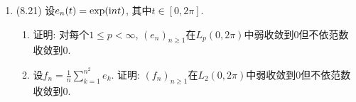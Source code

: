 \begin{enumerate}[label=\textbf{\arabic*.}, ref=\arabic*]
\begin{enumerate}[(1)]
\begin{enumerate}[(i)]
				\end{enumerate}
			\end{enumerate}
		\item (8.21) 设$ e_n(t)=\exp(\mathrm{i} nt) $, 其中$ t\in[0,2\pi] $.
			\begin{enumerate}[(1)]
			\item 证明: 对每个$ 1\leqslant p<\infty $, $ (e_n)_{n\geqslant 1} $在$ L_p(0,2\pi) $中弱收敛到0但不依范数收敛到0.
			\item 设$ f_n=\frac{1}{n}\sum\limits_{k=1}^{n^2}e_k $. 证明: $ (f_n)_{n\geqslant 1} $在$ L_2(0,2\pi) $中弱收敛到0但不依范数收敛到0.
			\end{enumerate}
	\end{enumerate}